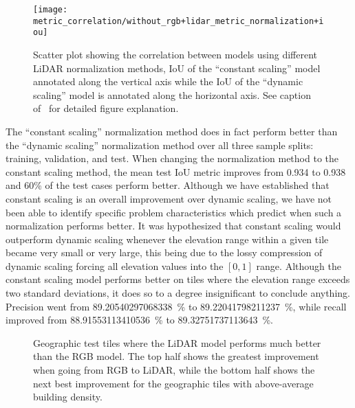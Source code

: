 \begin{figure}[H]
  \centering
  \texttt{[image: metric\_correlation/without\_rgb+lidar\_metric\_normalization+iou]}
  \caption{%
    Scatter plot showing the correlation between models using different LiDAR normalization methods, IoU of the \enquote{constant scaling} model annotated along the vertical axis while the IoU of the \enquote{dynamic scaling} model is annotated along the horizontal axis.
    See caption of~ for detailed figure explanation.
  }%
  \label{fig:normalization-correlation}
\end{figure}

The \enquote{constant scaling} normalization method does in fact perform better than the \enquote{dynamic scaling} normalization method over all three sample splits: training, validation, and test.
When changing the normalization method to the constant scaling method, the mean test IoU metric improves from \num{0.934} to \num{0.938} and 60\% of the test cases perform better.
Although we have established that constant scaling is an overall improvement over dynamic scaling, we have not been able to identify specific problem characteristics which predict when such a normalization performs better.
It was hypothesized that constant scaling would outperform dynamic scaling whenever the elevation range within a given tile became very small or very large, this being due to the lossy compression of dynamic scaling forcing all elevation values into the $[0, 1]$ range.
Although the constant scaling model performs better on tiles where the elevation range exceeds two standard deviations, it does so to a degree insignificant to conclude anything.
Precision went from \SI[round-mode=places,round-precision=2]{89.20540297068338}{\percent} to \SI[round-mode=places,round-precision=2]{89.22041798211237}{\percent}, while recall improved from \SI[round-mode=places,round-precision=2]{88.91553113410536}{\percent} to \SI[round-mode=places,round-precision=2]{89.32751737113643}{\percent}.

\begin{figure}[H]
  \centering
  \caption{%
    Geographic test tiles where the LiDAR model performs much better than the RGB model.
    The top half shows the greatest improvement when going from RGB to LiDAR, while the bottom half shows the next best improvement for the geographic tiles with above-average building density.
  }%
  \label{fig:constant-better-than-dynamic}
\end{figure}
